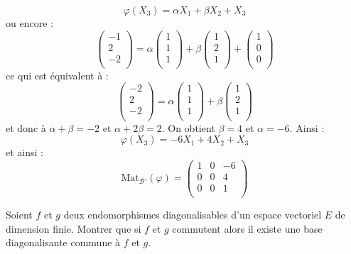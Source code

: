 \documentclass[a4paper,10pt]{report}
\begin{document}
\begin{enumerate}
$$ \varphi(X_3) = \alpha X_1 + \beta X_2 + X_3$$
ou encore :
$$ \begin{pmatrix}
-1 \\
2 \\
-2 \\
\end{pmatrix} = \alpha \begin{pmatrix}
1 \\
1 \\
1 \\
\end{pmatrix} + \beta \begin{pmatrix}
1 \\
2 \\
1 \\
\end{pmatrix} + \begin{pmatrix}
1 \\
0\\
0\\
\end{pmatrix}$$
ce qui est équivalent à :
$$  \begin{pmatrix}
-2 \\
2 \\
-2 \\
\end{pmatrix} = \alpha \begin{pmatrix}
1 \\
1 \\
1 \\
\end{pmatrix} + \beta \begin{pmatrix}
1 \\
2 \\
1 \\
\end{pmatrix} $$
et donc à $\alpha+ \beta =-2$ et $\alpha+2 \beta = 2$. On obtient $\beta =4$ et $\alpha = -6$. Ainsi :
$$ \varphi(X_3) = -6 X_1 + 4 X_2 + X_3$$
et ainsi :
$$ \textrm{Mat}_{\mathcal{B}'}(\varphi) = \begin{pmatrix}
1 & 0 & -6 \\
0 & 0 & 4 \\
0 & 0 & 1 \\
\end{pmatrix}$$
\end{enumerate}

\begin{Exercice}{}  Soient $f$ et $g$ deux endomorphismes diagonalisables d'un espace vectoriel $E$ de dimension finie. Montrer que si $f$ et $g$ commutent alors il existe une base diagonalisante commune à $f$ et $g$.
\end{Exercice}
\end{document}
